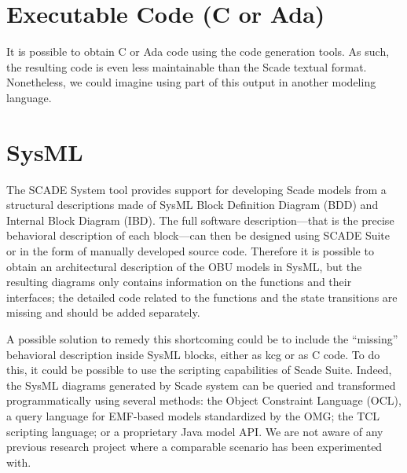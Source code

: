 \documentclass{template/openetcs_report}
\begin{document}
\section{Executable Code (C or Ada)}

It is possible to obtain C or Ada code using the code generation
tools. As such, the resulting code is even less maintainable than the
Scade textual format. Nonetheless, we could imagine using part of this
output in another modeling language.

\begin{center}
  \setlength{\fboxsep}{10pt}
\end{center}

\section{SysML}
\label{sec:sysml}

The SCADE System tool provides support for developing Scade models
from a structural descriptions made of SysML Block Definition Diagram
(BDD) and Internal Block Diagram (IBD).  The full software
description---that is the precise behavioral description of each
block---can then be designed using SCADE Suite or in the form of
manually developed source code. Therefore it is possible to obtain an
architectural description of the OBU models in SysML, but the
resulting diagrams only contains information on the functions and
their interfaces; the detailed code related to the functions and the
state transitions are missing and should be added separately.

A possible solution to remedy this shortcoming could be to include the
``missing'' behavioral description inside SysML blocks, either as kcg
or as C code. To do this, it could be possible to use the scripting
capabilities of Scade Suite. Indeed, the SysML diagrams generated by
Scade system can be queried and transformed programmatically using
several methods: the Object Constraint Language (OCL), a query
language for EMF-based models standardized by the OMG; the TCL
scripting language; or a proprietary Java model API. We are not aware
of any previous research project where a comparable scenario has been
experimented with.
\end{document}
